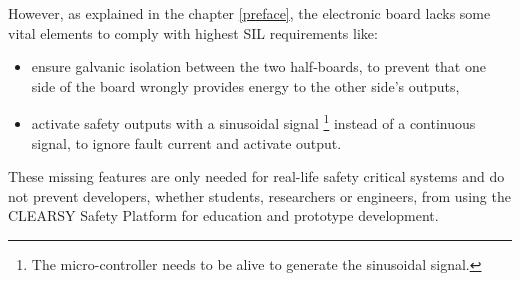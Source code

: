  However, as explained in the chapter \ref{preface}, the electronic board lacks some vital elements to comply with highest SIL requirements like:
 \begin{itemize}
     \item ensure galvanic isolation between the two half-boards, to prevent that one side of the board wrongly provides energy to the other side's outputs,
     \item activate safety outputs with a sinusoidal signal \footnote{The micro-controller needs to be alive to generate the sinusoidal signal.} instead of a continuous signal, to ignore fault current and activate output.
 \end{itemize}
These missing features are only needed for real-life safety critical systems and do not prevent developers, whether students, researchers or engineers, from using the CLEARSY Safety Platform for education and prototype development. 


